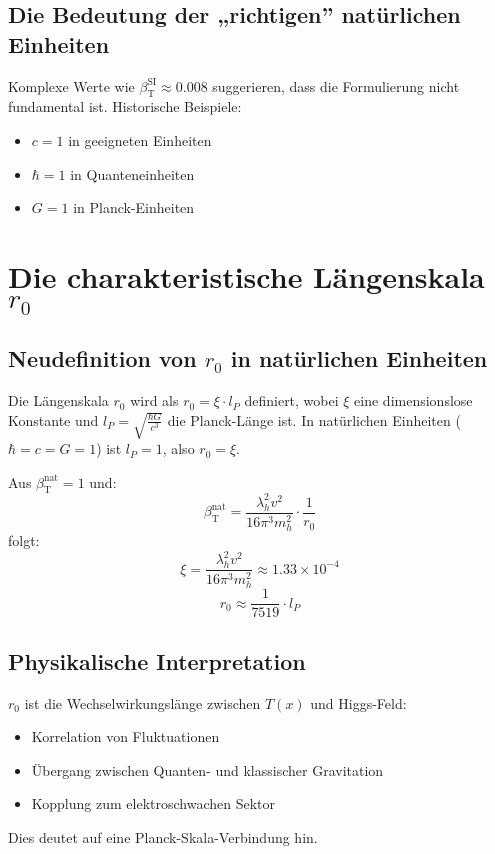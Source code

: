 \documentclass[12pt,a4paper]{article}
\newcommand{\Tfield}{T(x)}
\newcommand{\betaT}{\beta_{\text{T}}}
\begin{document}
	\subsection{Die Bedeutung der „richtigen'' natürlichen Einheiten}
	
	Komplexe Werte wie \(\betaT^{\text{SI}} \approx 0.008\) suggerieren, dass die Formulierung nicht fundamental ist. Historische Beispiele:
	\begin{itemize}
		\item \(c = 1\) in geeigneten Einheiten
		\item \(\hbar = 1\) in Quanteneinheiten
		\item \(G = 1\) in Planck-Einheiten
	\end{itemize}
	
	\section{Die charakteristische Längenskala \(r_0\)}
	
	\subsection{Neudefinition von \(r_0\) in natürlichen Einheiten}
	
	Die Längenskala \(r_0\) wird als \(r_0 = \xi \cdot l_P\) definiert, wobei \(\xi\) eine dimensionslose Konstante und \(l_P = \sqrt{\frac{\hbar G}{c^3}}\) die Planck-Länge ist. In natürlichen Einheiten (\(\hbar = c = G = 1\)) ist \(l_P = 1\), also \(r_0 = \xi\).
	
	Aus \(\betaT^{\text{nat}} = 1\) und:
	\begin{equation}
		\betaT^{\text{nat}} = \frac{\lambda_h^2 v^2}{16\pi^3 m_h^2} \cdot \frac{1}{r_0}
	\end{equation}
	folgt:
	\begin{equation}
		\xi = \frac{\lambda_h^2 v^2}{16\pi^3 m_h^2} \approx 1.33 \times 10^{-4}
	\end{equation}
	\begin{equation}
		r_0 \approx \frac{1}{7519} \cdot l_P
	\end{equation}
	
	\subsection{Physikalische Interpretation}
	
	\(r_0\) ist die Wechselwirkungslänge zwischen \(\Tfield\) und Higgs-Feld:
	\begin{itemize}
		\item Korrelation von Fluktuationen
		\item Übergang zwischen Quanten- und klassischer Gravitation
		\item Kopplung zum elektroschwachen Sektor
	\end{itemize}
	Dies deutet auf eine Planck-Skala-Verbindung hin.
	
\end{document}

